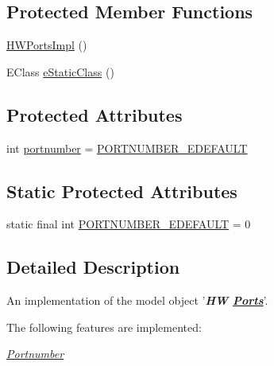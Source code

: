 \subsection*{Protected Member Functions}
\begin{DoxyCompactItemize}
\item 
\hyperlink{classshootingmachineemfmodel_1_1impl_1_1_h_w_ports_impl_a2ff8b38bf216e0a66d97860394a38400}{H\-W\-Ports\-Impl} ()
\item 
E\-Class \hyperlink{classshootingmachineemfmodel_1_1impl_1_1_h_w_ports_impl_a8a0c5ffff95dd757e1e00a6de427e3af}{e\-Static\-Class} ()
\end{DoxyCompactItemize}
\subsection*{Protected Attributes}
\begin{DoxyCompactItemize}
\item 
int \hyperlink{classshootingmachineemfmodel_1_1impl_1_1_h_w_ports_impl_aedf5c2544eab486e28a3411354837256}{portnumber} = \hyperlink{classshootingmachineemfmodel_1_1impl_1_1_h_w_ports_impl_a9ea1507bc0aeed88c064a12f4315ee1b}{P\-O\-R\-T\-N\-U\-M\-B\-E\-R\-\_\-\-E\-D\-E\-F\-A\-U\-L\-T}
\end{DoxyCompactItemize}
\subsection*{Static Protected Attributes}
\begin{DoxyCompactItemize}
\item 
static final int \hyperlink{classshootingmachineemfmodel_1_1impl_1_1_h_w_ports_impl_a9ea1507bc0aeed88c064a12f4315ee1b}{P\-O\-R\-T\-N\-U\-M\-B\-E\-R\-\_\-\-E\-D\-E\-F\-A\-U\-L\-T} = 0
\end{DoxyCompactItemize}


\subsection{Detailed Description}
An implementation of the model object '{\itshape {\bfseries H\-W \hyperlink{interfaceshootingmachineemfmodel_1_1_ports}{Ports}}}'.

The following features are implemented\-: 
\begin{DoxyItemize}
\item \hyperlink{classshootingmachineemfmodel_1_1impl_1_1_h_w_ports_impl_a097170781924f6c67ddfb46893fc67bb}{{\itshape Portnumber}} 
\end{DoxyItemize}

